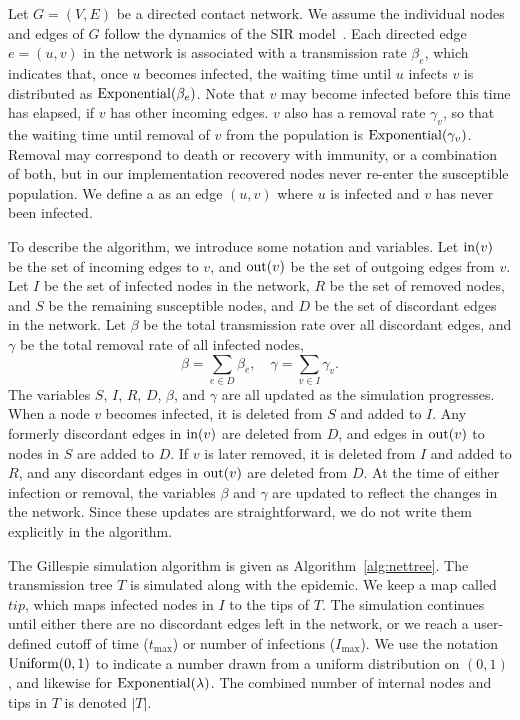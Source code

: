 Let $G = (V, E)$ be a directed contact network. We assume the individual nodes
and edges of $G$ follow the dynamics of the \gls{SIR}
model~\autocite{kermack1927contribution}. Each directed edge $e = (u, v)$ in
the network is associated with a transmission rate $\beta_e$, which indicates
that, once $u$ becomes infected, the waiting time until $u$ infects $v$ is
distributed as $\operatorname{Exponential}(\beta_e)$. Note that $v$ may become infected
before this time has elapsed, if $v$ has other incoming edges. $v$ also has a
removal rate $\gamma_v$, so that the waiting time until removal of $v$ from the
population is $\operatorname{Exponential}(\gamma_v)$. Removal may correspond to death or
recovery with immunity, or a combination of both, but in our implementation
recovered nodes never re-enter the susceptible population. We define a
 as an edge $(u, v)$ where $u$ is infected and $v$ has
never been infected.

To describe the algorithm, we introduce some notation and variables. Let
$\operatorname{in}(v)$ be the set of incoming edges to $v$, and $\operatorname{out}(v)$ be the set of
outgoing edges from $v$. Let $I$ be the set of infected nodes in the network,
$R$ be the set of removed nodes, and $S$ be the remaining susceptible nodes,
and $D$ be the set of discordant edges in the network. Let $\beta$ be the total
transmission rate over all discordant edges, and $\gamma$ be the total removal
rate of all infected nodes,
\[
  \beta = \sum_{e \in D} \beta_e, \quad
  \gamma = \sum_{v \in I} \gamma_v.
\]
The variables $S$, $I$, $R$, $D$, $\beta$, and $\gamma$ are all updated as the
simulation progresses. When a node $v$ becomes infected, it is deleted from $S$
and added to $I$. Any formerly discordant edges in $\operatorname{in}(v)$ are deleted from
$D$, and edges in $\operatorname{out}(v)$ to nodes in $S$ are added to $D$. If $v$ is later
removed, it is deleted from $I$ and added to $R$, and any discordant edges in
$\operatorname{out}(v)$ are deleted from $D$. At the time of either infection or removal, the
variables $\beta$ and $\gamma$ are updated to reflect the changes in the
network. Since these updates are straightforward, we do not write them
explicitly in the algorithm.

\newcommand{\tip}{\mathit{tip}}

The Gillespie simulation algorithm is given as Algorithm~\ref{alg:nettree}. The
transmission tree $T$ is simulated along with the epidemic. We keep a map
called $\tip$, which maps infected nodes in $I$ to the tips of $T$. The
simulation continues until either there are no discordant edges left in the
network, or we reach a user-defined cutoff of time ($t_{\max}$) or number of
infections ($I_{\max}$). We use the notation $\operatorname{Uniform}(0, 1)$ to indicate a
number drawn from a uniform distribution on $(0, 1)$, and likewise for
$\operatorname{Exponential}(\lambda)$. The combined number of internal nodes and tips in $T$
is denoted $|T|$.

